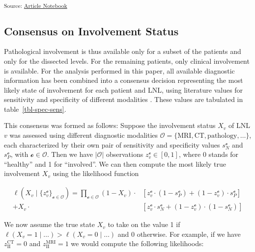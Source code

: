 \documentclass[
  sn-mathphys-num,
]{sn-jnl}
\begin{document}
\textsubscript{Source:
\href{https://rmnldwg.github.io/bilateral-paper/manuscript-preview.html}{Article
Notebook}}

\subsection{Consensus on Involvement
Status}\label{consensus-on-involvement-status}

Pathological involvement is thus available only for a subset of the
patients and only for the dissected levels. For the remaining patients,
only clinical involvement is available. For the analysis performed in
this paper, all available diagnostic information has been combined into
a consensus decision representing the most likely state of involvement
for each patient and LNL, using literature values for sensitivity and
specificity of different modalities
\citep{de_bondt_detection_2007, kyzas_18f-fluorodeoxyglucose_2008}.
These values are tabulated in table~\ref{tbl-spec-sens}.

This consensus was formed as follows: Suppose the involvement status
\(X_v\) of LNL \(v\) was assessed using different diagnostic modalities
\(\mathcal{O} = \{ \text{MRI}, \text{CT}, \text{pathology}, \ldots \}\),
each characterized by their own pair of sensitivity and specificity
values \(s_N^{\mathcal{o}}\) and \(s_P^{\mathcal{o}}\), with
\(\mathcal{o} \in \mathcal{O}\). Then we have \(|\mathcal{O}|\)
observations \(z_v^{\mathcal{o}} \in \left[ 0, 1 \right]\), where 0
stands for ``healthy'' and 1 for ``involved''. We can then compute the
most likely true involvement \(X_v\) using the likelihood function

\[
\begin{aligned}
\ell \left( X_v \mid \{ z_v^{\mathcal{o}} \}_{\mathcal{o} \in \mathcal{O}} \right) = \prod_{\mathcal{o} \in \mathcal{O}}
\left( 1 - X_v \right) \cdot &\left[ z_v^{\mathcal{o}} \cdot \left( 1 - s_P^{\mathcal{o}} \right) + \left( 1 - z_v^{\mathcal{o}} \right) \cdot s_P^{\mathcal{o}} \right] \\
+ X_v \cdot &\left[ z_v^{\mathcal{o}} \cdot s_N^{\mathcal{o}} + \left( 1 - z_v^{\mathcal{o}} \right) \cdot (1 - s_N^{\mathcal{o}}) \right]
\end{aligned}
\]

We now assume the true state \(X_v\) to take on the value 1 if
\(\ell \left( X_v = 1 \mid \ldots \right) > \ell \left( X_v = 0 \mid \ldots \right)\)
and 0 otherwise. For example, if we have \(z_\text{II}^\text{CT} = 0\)
and \(z_\text{II}^\text{MRI} = 1\) we would compute the following
likelihoods:
\end{document}
